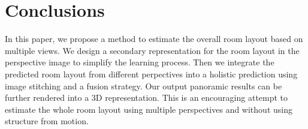 \section{Conclusions}
In this paper, we propose a method to estimate the overall room layout based on multiple views. We design a secondary representation for the room layout in the perspective image to simplify the learning process. Then we integrate the predicted room layout from different perpectives into a holistic prediction using image stitching and a fusion strategy. Our output panoramic results can be further rendered into a 3D representation. This is an encouraging attempt to estimate the whole room layout using multiple perspectives and without using structure from motion.

